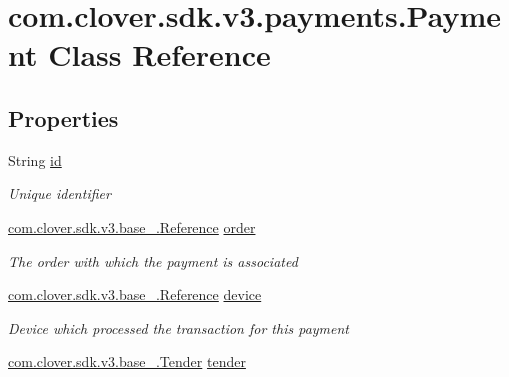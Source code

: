 \hypertarget{classcom_1_1clover_1_1sdk_1_1v3_1_1payments_1_1_payment}{}\section{com.\+clover.\+sdk.\+v3.\+payments.\+Payment Class Reference}
\label{classcom_1_1clover_1_1sdk_1_1v3_1_1payments_1_1_payment}
\subsection*{Properties}
\begin{DoxyCompactItemize}
\item 
String \hyperlink{classcom_1_1clover_1_1sdk_1_1v3_1_1payments_1_1_payment_a2997fca0b5f9e92d9ad1fc81b0602cd0}{id}
\begin{DoxyCompactList}\small\item\em Unique identifier \end{DoxyCompactList}\item 
\hyperlink{classcom_1_1clover_1_1sdk_1_1v3_1_1base___1_1_reference}{com.\+clover.\+sdk.\+v3.\+base\+\_\+.\+Reference} \hyperlink{classcom_1_1clover_1_1sdk_1_1v3_1_1payments_1_1_payment_ac5b27c5889d5cd387f5af14aaddf6ef0}{order}
\begin{DoxyCompactList}\small\item\em The order with which the payment is associated \end{DoxyCompactList}\item 
\hyperlink{classcom_1_1clover_1_1sdk_1_1v3_1_1base___1_1_reference}{com.\+clover.\+sdk.\+v3.\+base\+\_\+.\+Reference} \hyperlink{classcom_1_1clover_1_1sdk_1_1v3_1_1payments_1_1_payment_a1b8b9f84b368df44ad6b203ae74ac59e}{device}
\begin{DoxyCompactList}\small\item\em Device which processed the transaction for this payment \end{DoxyCompactList}\item 
\hyperlink{classcom_1_1clover_1_1sdk_1_1v3_1_1base___1_1_tender}{com.\+clover.\+sdk.\+v3.\+base\+\_\+.\+Tender} \hyperlink{classcom_1_1clover_1_1sdk_1_1v3_1_1payments_1_1_payment_ac60d98c319840e11aaf744accfa3b82c}{tender}

\end{DoxyCompactItemize}
